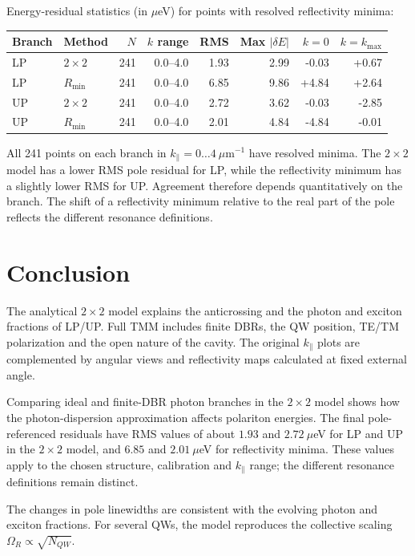\documentclass[12pt,a4paper]{article}
\begin{document}
Energy-residual statistics (in $\mu$eV) for points with resolved reflectivity minima:
\begin{center}
\small
\begin{tabular}{llrrrrrr}
\toprule
Branch & Method & $N$ & $k$ range & RMS & Max $|\delta E|$ & $k=0$ & $k=k_{\max}$ \\
\midrule
LP & $2\times2$ & 241 & 0.0--4.0 & 1.93 & 2.99 & -0.03 & +0.67 \\
LP & $R_{\min}$ & 241 & 0.0--4.0 & 6.85 & 9.86 & +4.84 & +2.64 \\
UP & $2\times2$ & 241 & 0.0--4.0 & 2.72 & 3.62 & -0.03 & -2.85 \\
UP & $R_{\min}$ & 241 & 0.0--4.0 & 2.01 & 4.84 & -4.84 & -0.01 \\
\bottomrule
\end{tabular}
\end{center}

All 241 points on each branch in
$k_\parallel=0\ldots4\ \mu\mathrm m^{-1}$ have resolved minima. The
$2\times2$ model has a lower RMS pole residual for LP, while the
reflectivity minimum has a slightly lower RMS for UP. Agreement therefore
depends quantitatively on the branch. The shift of a reflectivity minimum relative to the real part of the pole
reflects the different resonance definitions.


\clearpage
\section{Conclusion}

The analytical $2\times2$ model explains the anticrossing and the
photon and exciton fractions of LP/UP. Full TMM includes finite DBRs,
the QW position, TE/TM polarization and the open nature of the cavity.
The original $k_\parallel$ plots are complemented by angular views and
reflectivity maps calculated at fixed external angle.

Comparing ideal and finite-DBR photon branches in the $2\times2$ model
shows how the photon-dispersion approximation affects polariton energies.
The final pole-referenced residuals have RMS values of about
$1.93$ and $2.72\ \mu$eV for LP and UP in the $2\times2$ model, and
$6.85$ and $2.01\ \mu$eV for reflectivity minima. These values apply
to the chosen structure, calibration and $k_\parallel$ range; the
different resonance definitions remain distinct.

The changes in pole linewidths are consistent with the evolving
photon and exciton fractions. For several QWs, the model reproduces
the collective scaling $\Omega_R\propto\sqrt{N_{QW}}$.
\end{document}
